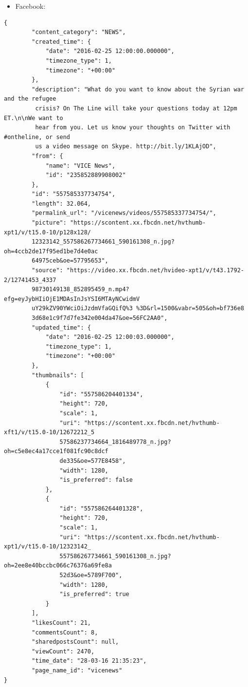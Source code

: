 \documentclass{article}
\begin{document}
\begin{itemize}
    \item Facebook:
\end{itemize}
\begin{Verbatim}
{
        "content_category": "NEWS",
        "created_time": {
            "date": "2016-02-25 12:00:00.000000",
            "timezone_type": 1,
            "timezone": "+00:00"
        },
        "description": "What do you want to know about the Syrian war and the refugee 
         crisis? On The Line will take your questions today at 12pm ET.\n\nWe want to
         hear from you. Let us know your thoughts on Twitter with #ontheline, or send 
         us a video message on Skype. http://bit.ly/1KLAjOD",
        "from": {
            "name": "VICE News",
            "id": "235852889908002"
        },
        "id": "557585337734754",
        "length": 32.064,
        "permalink_url": "/vicenews/videos/557585337734754/",
        "picture": "https://scontent.xx.fbcdn.net/hvthumb-xpt1/v/t15.0-10/p128x128/
        12323142_557586267734661_590161308_n.jpg?oh=4ccb2de17f95ed1be7d4e0ac
        64975ceb&oe=57795653",
        "source": "https://video.xx.fbcdn.net/hvideo-xpt1/v/t43.1792-2/12741453_4337
        98730149138_852895459_n.mp4?efg=eyJybHIiOjE1MDAsInJsYSI6MTAyNCwidmV
        uY29kZV90YWciOiJzdmVfaGQifQ%3 %3D&rl=1500&vabr=505&oh=bf736e8
        3d68e1c9f7d7fe342e004da47&oe=56FC2AA0",
        "updated_time": {
            "date": "2016-02-25 12:00:03.000000",
            "timezone_type": 1,
            "timezone": "+00:00"
        },
        "thumbnails": [
            {
                "id": "557586204401334",
                "height": 720,
                "scale": 1,
                "uri": "https://scontent.xx.fbcdn.net/hvthumb-xft1/v/t15.0-10/12672212_5
                57586237734664_1816489778_n.jpg?oh=c5e8ec4a17cce1f081fc90c8dcf
                de335&oe=577E8458",
                "width": 1280,
                "is_preferred": false
            },
            {
                "id": "557586264401328",
                "height": 720,
                "scale": 1,
                "uri": "https://scontent.xx.fbcdn.net/hvthumb-xpt1/v/t15.0-10/12323142_
                557586267734661_590161308_n.jpg?oh=2ee8e40bccbc066c76376a69fe8a
                52d3&oe=5789F700",
                "width": 1280,
                "is_preferred": true
            }
        ],
        "likesCount": 21,
        "commentsCount": 8,
        "sharedpostsCount": null,
        "viewCount": 2470,
        "time_date": "28-03-16 21:35:23",
        "page_name_id": "vicenews"
}
\end{Verbatim}
\end{document}
